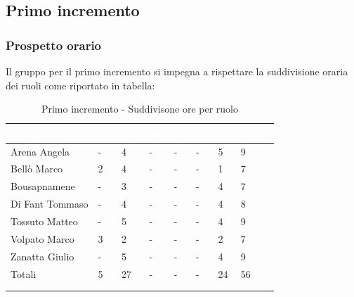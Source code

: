 \subsection{Primo incremento} 
{
    \subsubsection{Prospetto orario}
    {
    Il gruppo per il primo incremento si impegna a rispettare la suddivisione oraria dei ruoli come riportato in tabella:
      \setlength{\freewidth}{\dimexpr\textwidth-30\tabcolsep}
      \renewcommand{\arraystretch}{1.0}
      \setlength{\aboverulesep}{0pt}
      \setlength{\belowrulesep}{0pt}
      \begin{longtable}{C{.4\freewidth} C{.1\freewidth} C{.1\freewidth} C{.1\freewidth} C{.1\freewidth} C{.1\freewidth} C{.1\freewidth} C{.1\freewidth} C{.1\freewidth}}
      \toprule
      \textcolor{white}{\textbf{Componente}}&
      \textcolor{white}{\textbf{Re}}&
      \textcolor{white}{\textbf{Am}}&
      \textcolor{white}{\textbf{An}}&
      \textcolor{white}{\textbf{Pt}}&
      \textcolor{white}{\textbf{Pr}}&
      \textcolor{white}{\textbf{Ve}}&
      \textcolor{white}{\textbf{Ore}}\\
      \toprule
      \endhead

      Arena Angela & - & 4 & - & - & - & 5 & 9 \\
      Bellò Marco & 2 & 4 & - & - & - & 1 & 7 \\
      Bousapnamene & - & 3 & - & - & - & 4 & 7 \\
      Di Fant Tommaso & - & 4 & - & - & - & 4 & 8 \\
      Tossuto Matteo & - & 5 & - & - & - & 4 & 9 \\
      Volpato Marco & 3 & 2 & - & - & - & 2 & 7 \\
      Zanatta Giulio & - & 5 & - & - & - & 4 & 9 \\
      Totali & 5 & 27 & - & - & - & 24 & 56 \\
      \bottomrule
      \\
      \caption{Primo incremento - Suddivisone ore per ruolo}
      \end{longtable} 

}}

